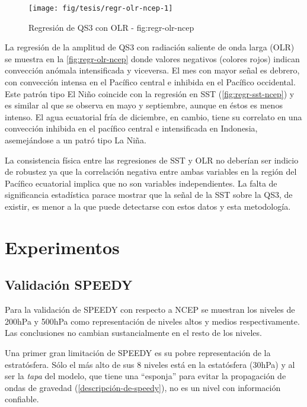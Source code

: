 \documentclass[spanish,a4paper]{book}
\begin{document}
\begin{landscape}\begin{figure}

{\centering \texttt{[image: fig/tesis/regr-olr-ncep-1]} 

}

\caption{Regresión de QS3 con OLR - fig:regr-olr-ncep}\label{fig:regr-olr-ncep}
\end{figure}
\end{landscape}

La regresión de la amplitud de QS3 con radiación saliente de onda larga
(OLR) se muestra en la \autoref{fig:regr-olr-ncep} donde valores
negativos (colores rojos) indican convección anómala intensificada y
viceversa. El mes con mayor señal es debrero, con convección intensa en
el Pacífico central e inhibida en el Pacífico occidental. Este patrón
tipo El Niño coincide con la regresión en SST
(\autoref{fig:regr-sst-ncep}) y es similar al que se observa en mayo y
septiembre, aunque en éstos es menos intenso. El agua ecuatorial fría de
diciembre, en cambio, tiene su correlato en una convección inhibida en
el pacífico central e intensificada en Indonesia, asemejándose a un
patró tipo La Niña.

La consistencia física entre las regresiones de SST y OLR no deberían
ser indicio de robustez ya que la correlación negativa entre ambas
variables en la región del Pacífico ecuatorial implica que no son
variables independientes. La falta de significancia estadística parace
mostrar que la señal de la SST sobre la QS3, de existir, es menor a la
que puede detectarse con estos datos y esta metodología.

\chapter{Experimentos}\label{experimentos}

\section{Validación SPEEDY}\label{validacion-speedy}

Para la validación de SPEEDY con respecto a NCEP se muestran los niveles
de 200hPa y 500hPa como representación de niveles altos y medios
respectivamente. Las conclusiones no cambian sustancialmente en el resto
de los niveles.

Una primer gran limitación de SPEEDY es su pobre representación de la
estratósfera. Sólo el más alto de sus 8 niveles está en la estatósfera
(30hPa) y al ser la \emph{tapa} del modelo, que tiene una ``esponja''
para evitar la propagación de ondas de gravedad
(\autoref{descripción-de-speedy}), no es un nivel con información
confiable.
\end{document}
